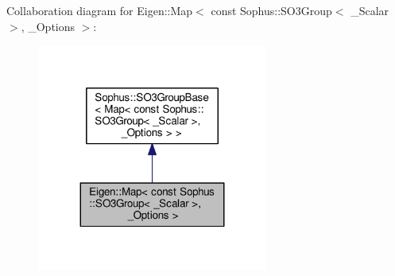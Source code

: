 Collaboration diagram for Eigen\+:\+:Map$<$ const Sophus\+:\+:S\+O3\+Group$<$ \+\_\+\+Scalar $>$, \+\_\+\+Options $>$\+:
\nopagebreak
\begin{figure}[H]
\begin{center}
\leavevmode
\includegraphics[width=215pt]{class_eigen_1_1_map_3_01const_01_sophus_1_1_s_o3_group_3_01___scalar_01_4_00_01___options_01_4__coll__graph}
\end{center}
\end{figure}
